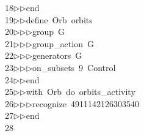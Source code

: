 \begin{tabbing}
18\>$\triangleright$\>$\triangleright$\>end\ \\[0pt]
19\>$\triangleright$\>$\triangleright$\>define\ Orb\ orbits\ \\[0pt]
20\>$\triangleright$\>$\triangleright$\>$\triangleright$\>group\ G\ \\[0pt]
21\>$\triangleright$\>$\triangleright$\>$\triangleright$\>group\_action\ G\ \\[0pt]
22\>$\triangleright$\>$\triangleright$\>$\triangleright$\>generators\ G\ \\[0pt]
23\>$\triangleright$\>$\triangleright$\>$\triangleright$\>on\_subsets\ 9\ Control\ \\[0pt]
24\>$\triangleright$\>$\triangleright$\>end\ \\[0pt]
25\>$\triangleright$\>$\triangleright$\>with\ Orb\ do\ orbits\_activity\ \\[0pt]
26\>$\triangleright$\>$\triangleright$\>$\triangleright$\>recognize\ 4911142126303540\ \\[0pt]
27\>$\triangleright$\>$\triangleright$\>end\\[0pt]
28\>\end{tabbing}
